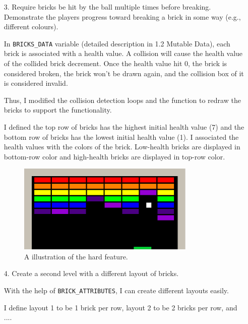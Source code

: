 \documentclass{article}
\newcommand{\code}[1]{\texttt{#1}}
\begin{document}
\begin{enumerate}
    \item[3.] Require bricks be hit by the ball multiple times before breaking. Demonstrate the players progress toward breaking a brick in some way (e.g., different colours).
    
    In \code{BRICKS\_DATA} variable (detailed description in 1.2 Mutable Data), each brick is associated with a health value. A collision will cause the health value of the collided brick decrement. Once the health value hit 0, the brick is considered broken, the brick won't be drawn again, and the collision box of it is considered invalid.

    Thus, I modified the collision detection loops and the function to redraw the bricks to support the functionality.

    I defined the top row of bricks has the highest initial health value (7) and the bottom row of bricks has the lowest initial health value (1). I associated the health values with the colors of the brick. Low-health bricks are displayed in bottom-row color and high-health bricks are displayed in top-row color.
    \begin{figure}[h!]
        \centering
        \includegraphics[width=0.8\textwidth]{feature_0.png}
        \caption{A illustration of the hard feature.}
    \end{figure}
    \item[4.] Create a second level with a different layout of bricks.
    
    With the help of \code{BRICK\_ATTRIBUTES}, I can create different layouts easily.

    I define layout 1 to be 1 brick per row, layout 2 to be 2 bricks per row, and ....


\end{enumerate}
\end{document}
